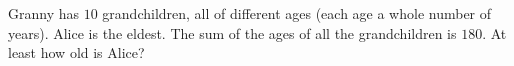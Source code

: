 Granny has $10$ grandchildren, all of different ages (each age a whole number of years). Alice is the eldest. The sum of the ages of all the grandchildren is $180$. At least how old is Alice?
